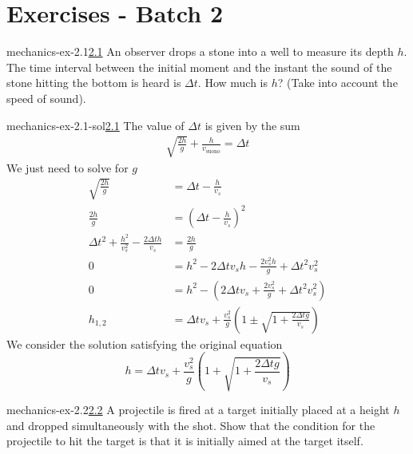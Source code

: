 \documentclass[preview]{standalone}
\begin{document}
\genpage

\section{Exercises - Batch 2}

\begin{snippetexercise}{mechanics-ex-2.1}{\underline{2.1}}
    An observer drops a stone into a well to measure its depth \(h\).
    The time interval between the initial moment and the instant the sound of the stone hitting the bottom
    is heard is \(\Delta t\). How much is \(h\)? (Take into account the speed of sound).
\end{snippetexercise}

\begin{snippetsolution}{mechanics-ex-2.1-sol}{\underline{2.1}}
    The value of \(\Delta t\) is given by the sum
    \begin{align*}
        \sqrt{\frac{2h}{g}} + \frac{h}{v_\text{suono}}
        = \Delta t
    \end{align*}
    We just need to solve for \(g\)
    \begin{align*}
        \sqrt{\frac{2h}{g}}
        &= \Delta t - \frac{h}{v_s} \\
        \frac{2h}{g} &= {\left(\Delta t - \frac{h}{v_s}\right)}^2 \\
        \Delta t^2 + \frac{h^2}{v_s^2} - \frac{2\Delta t h}{v_s} &= \frac{2h}{g} \\
        0 &= h^2 - 2 \Delta t v_s h - \frac{2v_s^2h}{g} + \Delta t^2 v_s^2 \\
        0 &= h^2 - \left(2\Delta t v_s + \frac{2v_s^2}{g} + \Delta t^2 v_s^2\right) \\
        h_{1,2} &= \Delta t v_s + \frac{v_s^2}{g} \left(
            1 \pm \sqrt{1 + \frac{2\Delta t g}{v_s}}
        \right)
    \end{align*}
    We consider the solution satisfying the original equation
    \[
        h = \Delta t v_s + \frac{v_s^2}{g} \left(
            1 + \sqrt{1 + \frac{2\Delta t g}{v_s}}
        \right)
    \]
\end{snippetsolution}

\begin{snippetexercise}{mechanics-ex-2.2}{\underline{2.2}}
    A projectile is fired at a target initially placed at a height \(h\) and dropped simultaneously with the shot.
    Show that the condition for the projectile to hit the target is that it is initially aimed at the target itself.
\end{snippetexercise}
\end{document}
